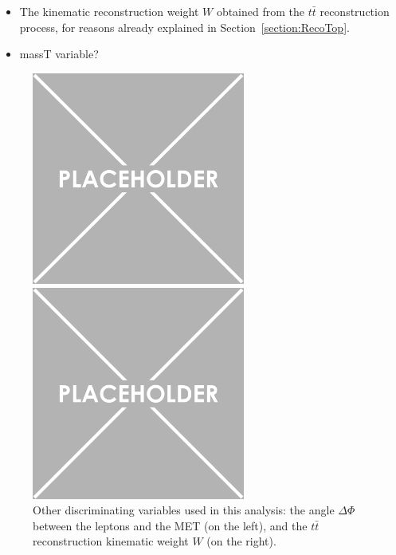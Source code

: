 \documentclass[a4paper, 10pt, openright]{report}
\begin{document}
\begin{itemize}
\begin{minipage}[c]{.32\linewidth}
{	}
   \end{minipage} \hfill
   \label{fig:scheme_deltaphi}

\item The kinematic reconstruction weight $W$ obtained from the $t \bar t$ reconstruction process, for reasons already explained in Section~\ref{section:RecoTop}.
\item \color{red} massT variable? \color{black}
\end{itemize}

\begin{figure}[htbp]
\centering
\begin{minipage}[b]{.48\textwidth}
\includegraphics[width=7cm, height=7cm]{figs/placeholder.png}
\end{minipage}\hfill
\begin{minipage}[b]{.48\textwidth}
\includegraphics[width=7cm, height=7cm]{figs/placeholder.png}
\end{minipage} \hfill
\caption{Other discriminating variables used in this analysis: the angle $\Delta \Phi$ between the leptons and the \ac{MET} (on the left), and the $t \bar t$ reconstruction kinematic weight $W$ (on the right).}
\label{fig:SRdisc3}
\end{figure}
\end{document}
